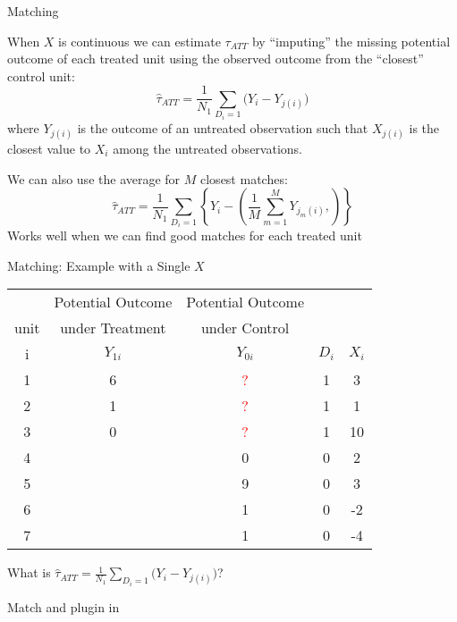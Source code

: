\documentclass{beamer}
\numberwithin{equation}{section}
\begin{document}
\begin{frame}{Matching}

When $X$ is continuous we can estimate $\tau_{ATT}$ by ``imputing''
the missing potential outcome of each treated unit using the observed
outcome from the ``closest'' control unit: \[
\widehat{\tau}_{ATT}= \frac{1}{N_1} \sum_{D_i=1}
\big(Y_i - Y_{j(i)}\big)
\] where $Y_{j(i)}$ is the outcome of an untreated observation such that
$X_{j(i)}$ is the \alert{closest} value to $X_i$ among the untreated
observations. \pause

We can also use the average for $M$ closest matches: \[
\widehat{\tau}_{ATT}= \frac{1}{N_1} \sum_{D_i=1} \left\{ Y_i -
\left(\frac{1}{M}\sum_{m=1}^M Y_{j_m(i)},\right)\right\}
\] Works well when we can find good matches for each treated unit

\end{frame}

\begin{frame}{Matching: Example with a Single $X$}

\begin{tabular}{c|c|c|c|c}
 &Potential Outcome & Potential Outcome &   & \\
unit &under Treatment  & under Control &   &  \\

\hline
   i  & $Y_{1i}$  & $Y_{0i}$ &    $D_i$ &  $X_i$ \\
\hline
         1 & \multicolumn{ 1}{c|}{6} & \multicolumn{ 1}{c|}{\textcolor{red}{?}} &                    1 &          3 \\
         2 & \multicolumn{ 1}{c|}{1} & \multicolumn{ 1}{c|}{\textcolor{red}{?}} &                    1 &          1 \\
         3 & \multicolumn{ 1}{c|}{0} & \multicolumn{ 1}{c|}{\textcolor{red}{?}} &                    1 &          10 \\
\hline
         4 & \multicolumn{ 1}{c|}{} & \multicolumn{1}{c|}{0} &                    0 &          2 \\
         5 & \multicolumn{ 1}{c|}{} & \multicolumn{1}{c|}{9} &                    0 &          3 \\
         6 & \multicolumn{ 1}{c|}{} & \multicolumn{1}{c|}{1} &                    0 &          -2 \\
         7 & \multicolumn{ 1}{c|}{} & \multicolumn{1}{c|}{1} &                    0 &          -4 \\
         \hline
\end{tabular}

What is
$\widehat{\tau}_{ATT}= \frac{1}{N_1} \sum_{D_i=1} \big(Y_i - Y_{j(i)}\big)$?
\pause

Match and plugin in

\end{frame}
\end{document}
